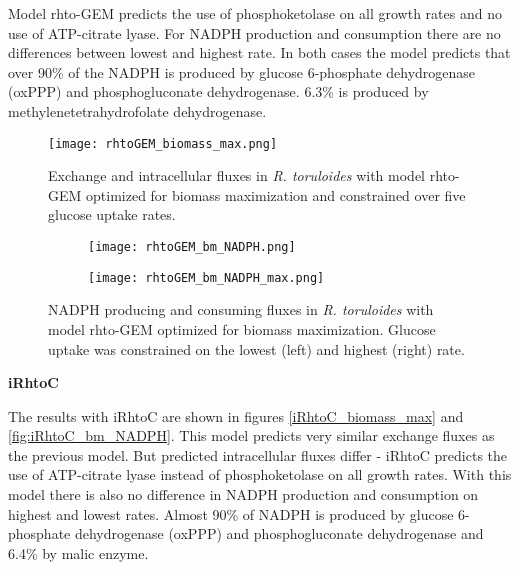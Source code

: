 Model rhto-GEM predicts the use of phosphoketolase on all growth rates and no use of ATP-citrate lyase. For NADPH production and consumption there are no differences 
between lowest and highest rate. In both cases the model predicts that over 90\% of the NADPH is produced by glucose 6-phosphate dehydrogenase (oxPPP) and
phosphogluconate dehydrogenase. 6.3\% is produced by methylenetetrahydrofolate dehydrogenase.



\begin{figure}[h!]
    \centering
    \texttt{[image: rhtoGEM\_biomass\_max.png]}
    \caption{Exchange and intracellular fluxes in \textit{R. toruloides} with model rhto-GEM optimized for biomass maximization 
    and constrained over five glucose uptake rates.}
    \label{rhto-GEM biomass max}
\end{figure}

\begin{figure}[h!]
    \centering
    \begin{subfigure}[h!]{0.49\textwidth}
        \centering
        \texttt{[image: rhtoGEM\_bm\_NADPH.png]}
    \end{subfigure}
    \hfill
    \begin{subfigure}[h!]{0.49\textwidth}
        \centering
        \texttt{[image: rhtoGEM\_bm\_NADPH\_max.png]}
    \end{subfigure}
    \caption{NADPH producing and consuming fluxes in \textit{R. toruloides} with model rhto-GEM optimized for biomass maximization. 
    Glucose uptake was constrained on the lowest (left) and highest (right) rate.}
    \label{fig:rhtoGEM_bm_NADPH}
\end{figure}




\textbf{iRhtoC}

The results with iRhtoC are shown in figures \ref{iRhtoC_biomass_max} and \ref{fig:iRhtoC_bm_NADPH}. 
This model predicts very similar exchange fluxes as the previous model. But predicted intracellular fluxes differ - iRhtoC predicts the use of 
ATP-citrate lyase instead of phosphoketolase on all growth rates. 
With this model there is also no difference in NADPH production and consumption on highest and lowest rates. 
Almost 90\% of NADPH is produced by glucose 6-phosphate dehydrogenase (oxPPP) and
phosphogluconate dehydrogenase and 6.4\% by malic enzyme. %


